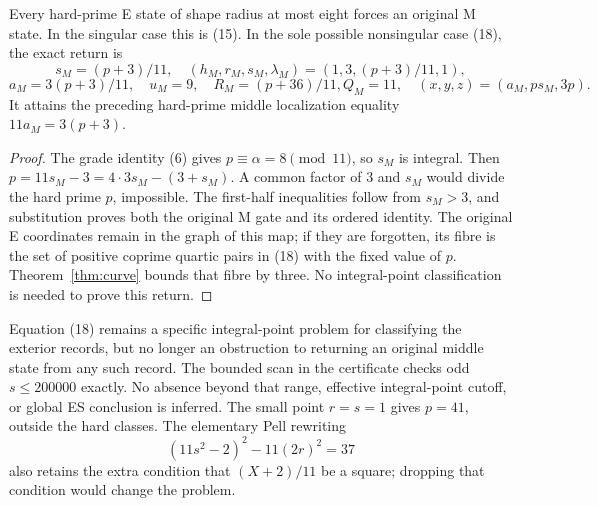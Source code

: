 \begin{corollary}
Every hard-prime E state of shape radius at most eight forces an original M
state. In the singular case this is (15). In the sole possible nonsingular
case (18), the exact return is
\[
 \boxed{s_M=(p+3)/11,\quad
 (h_M,r_M,s_M,\lambda_M)=(1,3,(p+3)/11,1),}
\]
\[
 \boxed{a_M=3(p+3)/11,\quad u_M=9,\quad R_M=(p+36)/11,
 Q_M=11,\quad (x,y,z)=(a_M,ps_M,3p).}                    \tag{18a}
\]
It attains the preceding hard-prime middle localization equality
$11a_M=3(p+3)$.
\end{corollary}
\begin{proof}
The grade identity (6) gives $p\equiv\alpha=8\pmod{11}$, so $s_M$ is integral.
Then $p=11s_M-3=4\cdot3s_M-(3+s_M)$. A common factor of $3$ and $s_M$
would divide the hard prime $p$, impossible. The first-half inequalities follow
from $s_M>3$, and substitution proves both the original M gate and its ordered
identity. The original E coordinates remain in the graph of this map; if they
are forgotten, its fibre is the set of positive coprime quartic pairs in (18)
with the fixed value of $p$. Theorem~\ref{thm:curve} bounds that fibre by three.
No integral-point classification is needed to prove this return.
\end{proof}

Equation (18) remains a specific integral-point problem for classifying the
exterior records, but no longer an obstruction to returning an original middle
state from any such record. The bounded scan in the certificate checks
odd $s\le200000$ exactly. No absence beyond that range, effective integral-point
cutoff, or global ES conclusion is inferred. The small point $r=s=1$ gives
$p=41$, outside the hard classes. The elementary Pell rewriting
\[
 (11s^2-2)^2-11(2r)^2=37
\]
also retains the extra condition that $(X+2)/11$ be a square; dropping that
condition would change the problem.

